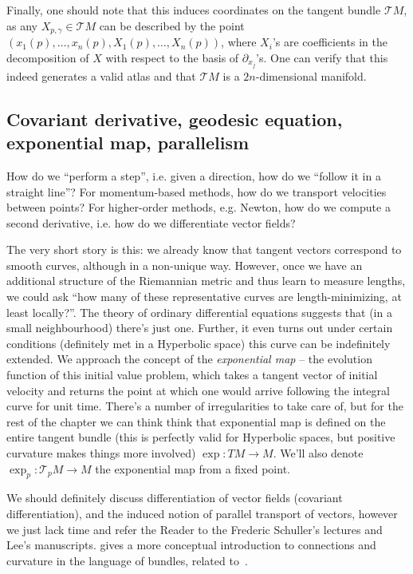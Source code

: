 Finally, one should note that this induces coordinates on the tangent bundle \(
\mathcal{T}M \), as any \( X_{p,\gamma} \in \mathcal{T}M \) can be described
by the point \( (x_1(p), \ldots, x_n(p), X_1(p), \ldots, X_n(p)) \),
where \( X_i \)'s are coefficients in the decomposition of \( X \) with respect
to the basis of \( \partial_{x_j} \)'s. One can verify that this indeed generates
a valid atlas and that \( \mathcal{T}M \) is a \(2n\)-dimensional manifold.

\subsection*{Covariant derivative, geodesic equation, exponential map, parallelism}

How do we ``perform a step'', i.e. given a direction, how do we ``follow it in
a straight line''? For momentum-based methods, how do we transport velocities
between points? For higher-order methods, e.g. Newton, how do we compute a
second derivative, i.e. how do we differentiate vector fields?

The very short story is this: we already know that tangent vectors correspond
to smooth curves, although in a non-unique way. However, once we have an
additional structure of the Riemannian metric and thus learn to measure lengths, we
could ask ``how many of these representative curves are length-minimizing, at
least locally?''. The theory of ordinary differential equations suggests that
(in a small neighbourhood) there's just one. Further, it even turns out under
certain conditions (definitely met in a Hyperbolic space) this curve can be
indefinitely extended. We approach the concept of the \emph{exponential map} --
the evolution function of this initial value problem, which takes a tangent
vector of initial velocity and returns the point at which one would arrive
following the integral curve for unit time. There's a number of irregularities
to take care of, but for the rest of the chapter we can think think
that exponential map is defined on the entire tangent bundle (this is perfectly
valid for Hyperbolic spaces, but positive curvature makes things more involved)
\( \exp: TM \to M \). We'll also denote \( \exp_p: \mathcal{T}_pM \to M \)
the exponential map from a fixed point.

We should definitely discuss differentiation of vector fields (covariant
differentiation), and the induced notion of parallel transport of vectors,
however we just lack time and refer the Reader to the Frederic Schuller's
lectures and Lee's manuscripts. \citet{hosgoodCurvature} gives a more
conceptual introduction to connections and curvature in the language of
bundles, related to~\citet{sontzBundles}.

